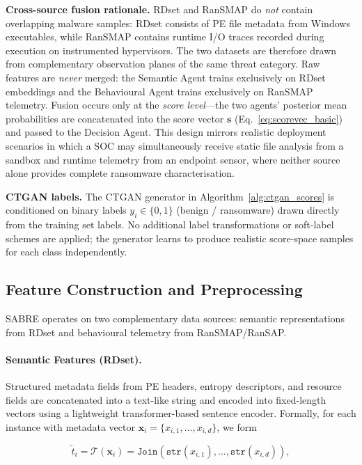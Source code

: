 \documentclass[lettersize,journal]{IEEEtran}
\begin{document}
\cbstart
\noindent\textbf{Cross-source fusion rationale.}
RDset and RanSMAP do \emph{not}
\cbend
 contain overlapping malware samples: RDset consists of PE
file metadata from Windows executables, while RanSMAP contains runtime I/O traces recorded
during execution on instrumented hypervisors. The two datasets are therefore drawn from
complementary observation planes of the same threat category. Raw features are
\emph{never} merged: the Semantic Agent trains exclusively on RDset embeddings and the
Behavioural Agent trains exclusively on RanSMAP telemetry. Fusion occurs only at the
\emph{score level}---the two agents' posterior mean probabilities are concatenated into the
score vector $\mathbf{s}$ (Eq.~\ref{eq:scorevec_basic}) and passed to the Decision Agent.
This design mirrors realistic deployment scenarios in which a SOC may simultaneously receive
static file analysis from a sandbox and runtime telemetry from an endpoint sensor, where
neither source alone provides complete ransomware characterisation.


\cbstart
\noindent\textbf{CTGAN labels.}
The CTGAN generator in Algorithm~\ref{alg:ctgan_scores} is conditioned on binary labels
$y_i \in \{0,1\}$ (benign / ransomware) drawn directly from the training set labels. No
additional label transformations or soft-label schemes are applied; the generator learns to
produce realistic score-space samples for each class independently.
\cbend



\subsection{Feature Construction and Preprocessing}

SABRE operates on two complementary data sources: semantic representations from RDset and behavioural telemetry from RanSMAP/RanSAP.

\paragraph{Semantic Features (RDset).}
Structured metadata fields from PE headers, entropy
descriptors, and resource fields are concatenated into a text-like string and encoded into fixed-length vectors using a lightweight transformer-based
sentence encoder. Formally, for each instance with metadata vector
$\mathbf{x}_i = \{x_{i,1}, \ldots, x_{i,d}\}$, we form

\begin{equation}
\tilde{t}_i = \mathcal{T}(\mathbf{x}_i) = \texttt{Join}(\texttt{str}(x_{i,1}), \ldots, \texttt{str}(x_{i,d})),
\end{equation}
\end{document}
